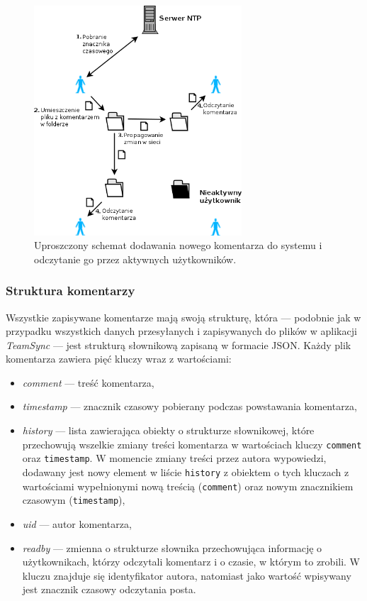 \begin{figure}[t]
  \vspace{5pt}
  \begin{center}
    \includegraphics[width=220pt]{figures/writecomment.png}
  \end{center}
  \caption{Uproszczony schemat dodawania nowego komentarza do systemu i odczytanie go przez aktywnych użytkowników.}
  \label{rys:writecomment}
\end{figure}

\subsubsection*{Struktura komentarzy}

Wszystkie zapisywane komentarze mają swoją strukturę, która --- podobnie jak w przypadku wszystkich danych przesyłanych i zapisywanych do plików w aplikacji \emph{TeamSync} --- jest strukturą słownikową zapisaną w formacie JSON. Każdy plik komentarza zawiera pięć kluczy wraz z wartościami:

\begin{itemize}[noitemsep]
 \item \emph{comment} --- treść komentarza,
 
 \item \emph{timestamp} --- znacznik czasowy pobierany podczas powstawania komentarza,
 
 \item \emph{history} --- lista zawierająca obiekty o strukturze słownikowej, które przechowują wszelkie zmiany treści komentarza w wartościach kluczy \texttt{comment} oraz \texttt{timestamp}. W momencie zmiany treści przez autora wypowiedzi, dodawany jest nowy element w liście \texttt{history} z obiektem o tych kluczach z wartościami wypełnionymi nową treścią (\texttt{comment}) oraz nowym znacznikiem czasowym (\texttt{timestamp}),
 
 \item \emph{uid} --- autor komentarza,
 
 \item \emph{readby} --- zmienna o strukturze słownika przechowująca informację o użytkownikach, którzy odczytali komentarz i o czasie, w którym to zrobili. W kluczu znajduje się identyfikator autora, natomiast jako wartość wpisywany jest znacznik czasowy odczytania posta.
\end{itemize}


